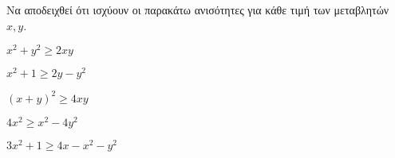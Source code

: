 Να αποδειχθεί ότι ισχύουν οι παρακάτω ανισότητες για κάθε τιμή των μεταβλητών $ x,y $.
\begin{multicols}{2}
\begin{alist}
\item $ x^2+y^2\geq 2xy $
\item $ x^2+1\geq 2y-y^2 $
\item $ (x+y)^2\geq 4xy $
\item $ 4x^2\geq x^2-4y^2 $
\end{alist}
\end{multicols}
\vspace{-7mm}
\begin{alist}[start=5]
\item $ 3x^2+1\geq 4x-x^2-y^2 $
\end{alist}
